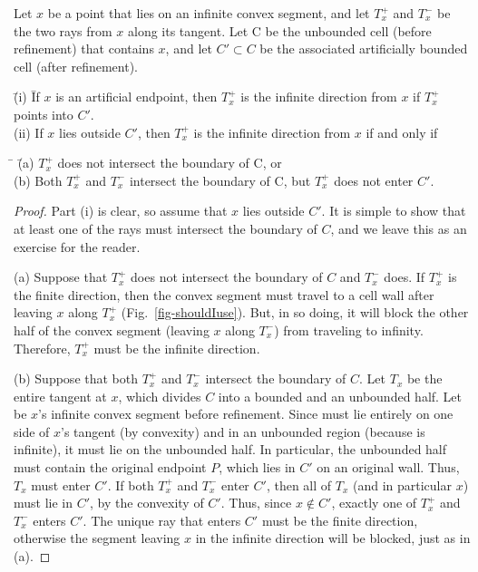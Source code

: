 \begin{lemma}
\label{lem-ty}
Let $x$ be a point that lies on an infinite convex segment,
and let $T_{x}^{+}$ and $T_{x}^{-}$ be the two rays from $x$ along its tangent.
Let C be the unbounded cell {\rm (}before refinement{\rm )} that contains $x$, and 
let $C' \subset C$ be the associated artificially bounded cell 
{\rm (}after refinement{\rm )}.
%
\begin{tabbing}
\indent \= {\rm (i)} \= If $x$ is an artificial endpoint,
then $T_{x}^{+}$ is the infinite direction from $x$ if 
$T_{x}^{+}$ \\
\> \> points into $C'$.\\
\> {\rm (ii)} If $x$ lies outside $C'$, then 
$T_{x}^{+}$ is the infinite direction from $x$ if and only if
\end{tabbing}
\begin{tabbing}
\indent \= \hspace{.15in} \= {\rm (a)} $T_{x}^{+}$ does not intersect the boundary of C, or\\
\> \> {\rm (b)} Both $T_{x}^{+}$ and $T_{x}^{-}$ intersect the boundary of C, 
	but $T_{x}^{+}$ does not enter $C'$.
\end{tabbing}
\end{lemma}
\begin{proof}
Part (i) is clear, so assume that $x$ lies outside $C'$.
It is simple to show that at least one of the rays must intersect the boundary
of $C$, and we leave this as an exercise for the reader.

(a) Suppose that $T_{x}^{+}$ does not intersect the boundary of $C$ and $T_{x}^{-}$ does.
If $T_{x}^{+}$ is the finite direction,
then the convex segment must travel to a cell wall after leaving $x$ along $T_{x}^{+}$
(Fig.~\ref{fig-shouldIuse}).
But, in so doing, it will block the other half of the convex segment 
(leaving $x$ along $T_{x}^{-}$) from traveling to infinity.
Therefore, $T_{x}^{+}$ must be the infinite direction.

(b) Suppose that both $T_{x}^{+}$ and $T_{x}^{-}$ intersect the boundary of $C$.
Let $T_{x}$ be the entire tangent at $x$, which 
divides $C$ into a bounded and an unbounded half.
Let  be $x$'s infinite convex segment before refinement.
Since  must lie entirely on one side of $x$'s tangent (by convexity)
and in an unbounded region (because  is infinite), it must lie
on the unbounded half.
In particular, the unbounded half must contain the original endpoint $P$, which
lies in $C'$ on an original wall.
Thus, $T_{x}$ must enter $C'$.
If both $T_{x}^{+}$ and $T_{x}^{-}$ enter $C'$, then 
all of $T_{x}$ (and in particular $x$) must lie in $C'$, by the
convexity of $C'$.
Thus, since $x \not\in C'$, exactly one of $T_{x}^{+}$ and $T_{x}^{-}$
enters $C'$.
The unique ray that enters $C'$ must be the finite direction, otherwise 
the segment leaving $x$ in the infinite direction will be blocked, just as in (a).
\end{proof}

